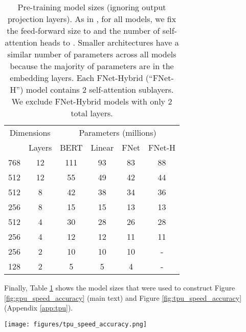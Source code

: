 \documentclass[11pt]{article}
\begin{document}
\begin{table}
    \caption{Pre-training model sizes (ignoring output projection layers). As in \citet{turc2019well}, for all models, we fix the feed-forward size to  and the number of self-attention heads to . Smaller architectures have a similar number of parameters across all models because the majority of parameters are in the embedding layers. Each FNet-Hybrid (``FNet-H'') model contains 2 self-attention sublayers. We exclude FNet-Hybrid models with only 2 total layers.}
    \label{tab:model_sizes}
    \centering
    \setlength{\tabcolsep}{4pt}
    \begin{tabular}{c c | c c c c}
        \hline
        \multicolumn{2}{c|}{Dimensions} & \multicolumn{4}{c}{Parameters (millions)}  \\ 
         & Layers & BERT & Linear & FNet & FNet-H  \\
          \hline \hline
        768  & 12 & 111 & 93 & 83 & 88 \\
        512  & 12 & 55 & 49 & 42 & 44 \\
        512  & 8 & 42 & 38 & 34 & 36 \\
        256 & 8 & 15 & 15 & 13 & 13 \\
        512 & 4 & 30 & 28 & 26 & 28 \\
        256  & 4 & 12 & 12 & 11 & 11\\
        256 & 2 & 10 & 10 & 10 & - \\
        128 & 2 & 5 & 5 & 4 & - \\ \hline
    \end{tabular}
\end{table}

Finally, Table \ref{tab:model_sizes} shows the model sizes that were used to construct Figure \ref{fig:gpu_speed_accuracy} (main text) and Figure \ref{fig:tpu_speed_accuracy} (Appendix \ref{app:tpu}).


\begin{figure*}
    \centering
    \texttt{[image: figures/tpu\_speed\_accuracy.png]}
    \caption{Speed-accuracy trade-offs for TPU pre-training. The dashed line shows the Pareto efficiency frontier.}
    \label{fig:tpu_speed_accuracy}
\end{figure*}
\end{document}

